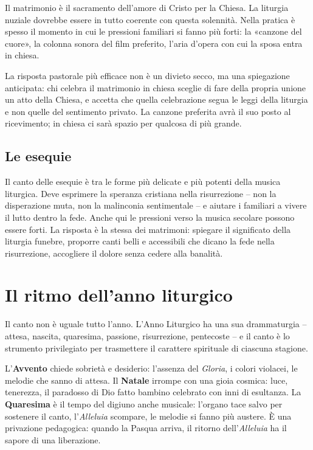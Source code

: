 \documentclass[12pt,a4paper]{article}
\begin{document}
	Il matrimonio è il sacramento dell'amore di Cristo per la Chiesa. La liturgia
	nuziale dovrebbe essere in tutto coerente con questa solennità. Nella pratica è
	spesso il momento in cui le pressioni familiari si fanno più forti: la «canzone
	del cuore», la colonna sonora del film preferito, l'aria d'opera con cui la sposa
	entra in chiesa.
	
	La risposta pastorale più efficace non è un divieto secco, ma una spiegazione
	anticipata: chi celebra il matrimonio in chiesa sceglie di fare della propria
	unione un atto della Chiesa, e accetta che quella celebrazione segua le leggi
	della liturgia e non quelle del sentimento privato. La canzone preferita avrà il
	suo posto al ricevimento; in chiesa ci sarà spazio per qualcosa di più grande.
	
	\subsection{Le esequie}
	
	Il canto delle esequie è tra le forme più delicate e più potenti della musica
	liturgica. Deve esprimere la speranza cristiana nella risurrezione -- non la
	disperazione muta, non la malinconia sentimentale -- e aiutare i familiari a
	vivere il lutto dentro la fede. Anche qui le pressioni verso la musica secolare
	possono essere forti. La risposta è la stessa dei matrimoni: spiegare il
	significato della liturgia funebre, proporre canti belli e accessibili che dicano
	la fede nella risurrezione, accogliere il dolore senza cedere alla banalità.
	
	\section{Il ritmo dell'anno liturgico}
	
	Il canto non è uguale tutto l'anno. L'Anno Liturgico ha una sua drammaturgia --
	attesa, nascita, quaresima, passione, risurrezione, pentecoste -- e il canto è
	lo strumento privilegiato per trasmettere il carattere spirituale di ciascuna
	stagione.
	
	L'\textbf{Avvento} chiede sobrietà e desiderio: l'assenza del \emph{Gloria}, i
	colori violacei, le melodie che sanno di attesa. Il \textbf{Natale} irrompe con
	una gioia cosmica: luce, tenerezza, il paradosso di Dio fatto bambino celebrato
	con inni di esultanza. La \textbf{Quaresima} è il tempo del digiuno anche
	musicale: l'organo tace salvo per sostenere il canto, l'\emph{Alleluia}
	scompare, le melodie si fanno più austere. È una privazione pedagogica: quando la
	Pasqua arriva, il ritorno dell'\emph{Alleluia} ha il sapore di una liberazione.
	
\end{document}
